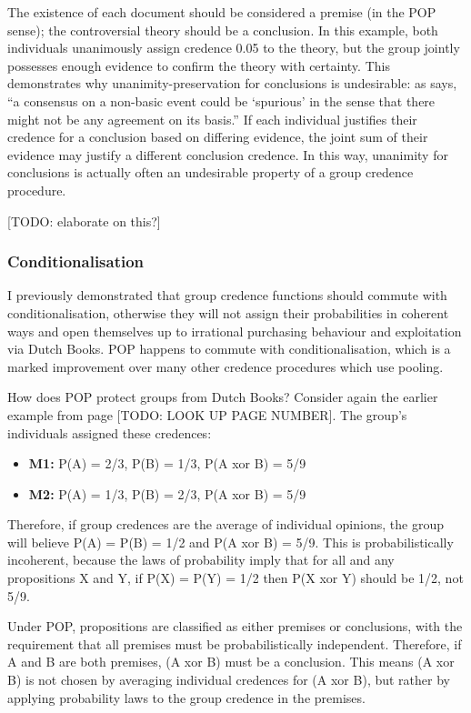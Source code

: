 \documentclass{article}
\begin{document}
\noindent
The existence of each document should be considered a premise (in the POP sense); the controversial theory should be a conclusion. In this example, both individuals unanimously assign credence 0.05 to the theory, but the group jointly possesses enough evidence to confirm the theory with certainty. This demonstrates why unanimity-preservation for conclusions is undesirable: as \citet{dietrich2013probabilistic} says, ``a consensus on a non-basic event could be `spurious' in the sense that there might not be any agreement on its basis.'' If each individual justifies their credence for a conclusion based on differing evidence, the joint sum of their evidence may justify a different conclusion credence. In this way, unanimity for conclusions is actually often an undesirable property of a group credence procedure.

[TODO: elaborate on this?]

\subsubsection{Conditionalisation}

I previously demonstrated that group credence functions should commute with conditionalisation, otherwise they will not assign their probabilities in coherent ways and open themselves up to irrational purchasing behaviour and exploitation via Dutch Books. POP happens to commute with conditionalisation, which is a marked improvement over many other credence procedures which use pooling.

How does POP protect groups from Dutch Books? Consider again the earlier example from page [TODO: LOOK UP PAGE NUMBER]. The group's individuals assigned these credences:

\begin{itemize}
	\item \textbf{M1:} P(A) = 2/3, P(B) = 1/3, P(A xor B) = 5/9
	\item \textbf{M2:} P(A) = 1/3, P(B) = 2/3, P(A xor B) = 5/9
\end{itemize}

Therefore, if group credences are the average of individual opinions, the group will believe P(A) = P(B) = 1/2 and P(A xor B) = 5/9. This is probabilistically incoherent, because the laws of probability imply that for all and any propositions X and Y, if P(X) = P(Y) = 1/2 then P(X xor Y) should be 1/2, not 5/9.

Under POP, propositions are classified as either premises or conclusions, with the requirement that all premises must be probabilistically independent. Therefore, if A and B are both premises, (A xor B) must be a conclusion. This means (A xor B) is not chosen by averaging individual credences for (A xor B), but rather by applying probability laws to the group credence in the premises.
\end{document}
